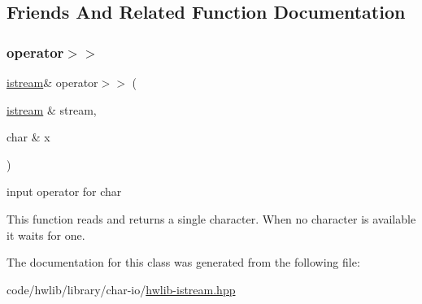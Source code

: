 \subsection{Friends And Related Function Documentation}
\mbox{\label{classhwlib_1_1istream_a88dabf0f321a5f098ede5ee108d0a92b}} 
\subsubsection{\texorpdfstring{operator$>$$>$}{operator>>}}
{\footnotesize\ttfamily \hyperlink{classhwlib_1_1istream}{istream}\& operator$>$$>$ (\begin{DoxyParamCaption}\item[{\hyperlink{classhwlib_1_1istream}{istream} \&}]{stream,  }\item[{char \&}]{x }\end{DoxyParamCaption})\hspace{0.3cm}{\ttfamily [friend]}}

input operator for char

This function reads and \textquotesingle{}returns\textquotesingle{} a single character. When no character is available it waits for one. 

The documentation for this class was generated from the following file\+:\begin{DoxyCompactItemize}
\item 
code/hwlib/library/char-\/io/\hyperlink{hwlib-istream_8hpp}{hwlib-\/istream.\+hpp}\end{DoxyCompactItemize}
